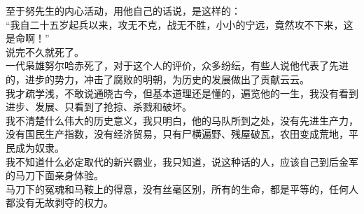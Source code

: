 \begin{multicols}{\theparacolNo}
至于努先生的内心活动，用他自己的话说，是这样的：\\

“我自二十五岁起兵以来，攻无不克，战无不胜，小小的宁远，竟然攻不下来，这是命啊！”\\

说完不久就死了。\\

一代枭雄努尔哈赤死了，对于这个人的评价，众多纷纭，有些人说他代表了先进的，进步的势力，冲击了腐败的明朝，为历史的发展做出了贡献云云。\\

我才疏学浅，不敢说通晓古今，但基本道理还是懂的，遍览他的一生，我没有看到进步、发展、只看到了抢掠、杀戮和破坏。\\

我不清楚什么伟大的历史意义，我只明白，他的马队所到之处，没有先进生产力，没有国民生产指数，没有经济贸易，只有尸横遍野、残屋破瓦，农田变成荒地，平民成为奴隶。\\

我不知道什么必定取代的新兴霸业，我只知道，说这种话的人，应该自己到后金军的马刀下面亲身体验。\\

马刀下的冤魂和马鞍上的得意，没有丝毫区别，所有的生命，都是平等的，任何人都没有无故剥夺的权力。\\
\ifnum{}
	\end{multicols}
\fi
